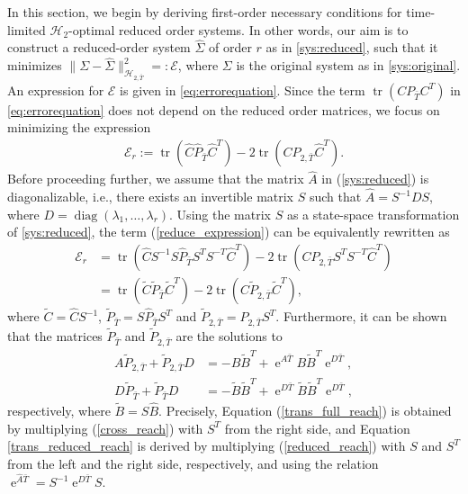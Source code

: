 \documentclass[a4paper,11pt, twoside]{article}
\newcommand{\expn}{\operatorname{e}}
\newcommand{\diag}{\operatorname{diag}}
\newcommand{\trace}{\operatorname{tr}}
\begin{document}
In this section, we begin by deriving first-order necessary conditions for time-limited $\mathcal H_2$-optimal reduced order systems. In other 
words, our aim is to construct a reduced-order system $\hat{\Sigma}$ of order $r$ as in \eqref{sys:reduced}, such that it minimizes 
$\|\Sigma-\hat{\Sigma}\|^2_{\mathcal H_{2,\bar T}} =: \mathcal E$, where $\Sigma$ is the original system as in \eqref{sys:original}. An expression 
for $\mathcal E$ is given in \eqref{eq:errorequation}.  Since the term $\trace(C P_{\bar T} C^T)$ in \eqref{eq:errorequation} does not depend on the 
reduced order matrices, we focus on minimizing the expression\begin{align}\label{reduce_expression}  
\mathcal E_r := \trace(\hat C \hat P_{\bar T} \hat C^T) - 2 \trace(C P_{2, \bar T} \hat C^T).
\end{align} 
Before proceeding further, we assume that the matrix $\hat A$ in (\ref{sys:reduced}) is diagonalizable, i.e., there exists an invertible matrix $S$ 
such that $\hat A=S^{-1} D S$, where $D=\diag(\lambda_1, \ldots, \lambda_r)$. Using the 
matrix $S$ as a state-space transformation of \eqref{sys:reduced}, the term (\ref{reduce_expression}) can be equivalently rewritten as 
\begin{align}\nonumber 
\mathcal E_r&=\trace(\hat C S^{-1} S \hat P_{\bar T}S^TS^{-T} \hat C^T) - 2 \trace(C 
P_{2, \bar T} S^T S^{-T}\hat C^T)\\
&=\trace(\tilde C \tilde P_{\bar T} \tilde C^T) - 2 \trace(C \tilde P_{2, \bar T}  \tilde C^T),\label{trans_min}
\end{align}
where $\tilde C=\hat C S^{-1}$, $\tilde P_{\bar T}=S \hat P_{\bar T}S^T$ and $\tilde P_{2, \bar T}=P_{2, \bar T} S^T$. Furthermore, it can be shown
that the matrices $\tilde P_{\bar T}$ and  $\tilde P_{2, \bar T}$ are the solutions to
\begin{align}\label{trans_full_reach}
A \tilde P_{2, {\bar T}}+ \tilde P_{2, {\bar T}} D &=-B \tilde B^T+\expn^{A \bar T}B \tilde B^T \expn^{D \bar T}, \\ 
\label{trans_reduced_reach}
D\tilde P_{\bar T}+\tilde P_{\bar T} D &=-\tilde B \tilde B^T+\expn^{D \bar T}\tilde B \tilde B^T \expn^{D \bar T},                   
\end{align}
respectively, where $\tilde B=S\hat B$. Precisely, Equation (\ref{trans_full_reach}) is obtained by multiplying (\ref{cross_reach})
with $S^T$ from the right side, and Equation  \eqref{trans_reduced_reach} is derived by multiplying (\ref{reduced_reach}) with
$S$ and $S^T$ from the left and the right side, respectively, and using the relation $\expn^{\hat A \bar T}=S^{-1} \expn^{D \bar T}S$. \smallskip
\end{document}
